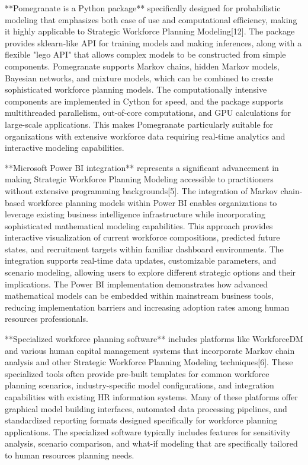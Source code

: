 \documentclass[main.tex]{subfiles}
\begin{document}
**Pomegranate is a Python package** specifically designed for probabilistic modeling that emphasizes both ease of use and computational efficiency, making it highly applicable to Strategic Workforce Planning Modeling[12]. The package provides sklearn-like API for training models and making inferences, along with a flexible "lego API" that allows complex models to be constructed from simple components. Pomegranate supports Markov chains, hidden Markov models, Bayesian networks, and mixture models, which can be combined to create sophisticated workforce planning models. The computationally intensive components are implemented in Cython for speed, and the package supports multithreaded parallelism, out-of-core computations, and GPU calculations for large-scale applications. This makes Pomegranate particularly suitable for organizations with extensive workforce data requiring real-time analytics and interactive modeling capabilities.

**Microsoft Power BI integration** represents a significant advancement in making Strategic Workforce Planning Modeling accessible to practitioners without extensive programming backgrounds[5]. The integration of Markov chain-based workforce planning models within Power BI enables organizations to leverage existing business intelligence infrastructure while incorporating sophisticated mathematical modeling capabilities. This approach provides interactive visualization of current workforce compositions, predicted future states, and recruitment targets within familiar dashboard environments. The integration supports real-time data updates, customizable parameters, and scenario modeling, allowing users to explore different strategic options and their implications. The Power BI implementation demonstrates how advanced mathematical models can be embedded within mainstream business tools, reducing implementation barriers and increasing adoption rates among human resources professionals.

**Specialized workforce planning software** includes platforms like WorkforceDM and various human capital management systems that incorporate Markov chain analysis and other Strategic Workforce Planning Modeling techniques[6]. These specialized tools often provide pre-built templates for common workforce planning scenarios, industry-specific model configurations, and integration capabilities with existing HR information systems. Many of these platforms offer graphical model building interfaces, automated data processing pipelines, and standardized reporting formats designed specifically for workforce planning applications. The specialized software typically includes features for sensitivity analysis, scenario comparison, and what-if modeling that are specifically tailored to human resources planning needs.
\end{document}

